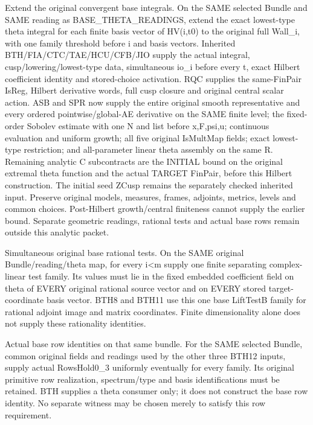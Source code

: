 \begin{description}[style=nextline]
\item[32. BASE\_THETA\_CUSPIDAL\_EXTENSION --- C] Extend the original convergent base integrals. On the SAME selected Bundle and SAME reading as BASE\_THETA\_READINGS, extend the exact lowest-type theta integral for each finite basis vector of HV(i,t0) to the original full Wall\_i, with one family threshold before i and basis vectors. Inherited BTH/FIA/CTC/TAE/HCU/CFB/JIO supply the actual integral, cusp/lowering/lowest-type data, simultaneous io\_i before every t, exact Hilbert coefficient identity and stored-choice activation. RQC supplies the same-FinPair IsReg, Hilbert derivative words, full cusp closure and original central scalar action. ASB and SPR now supply the entire original smooth representative and every ordered pointwise/global-AE derivative on the SAME finite level; the fixed-order Sobolev estimate with one N and list before x,F,psi,u; continuous evaluation and uniform growth; all five original IsMultMap fields; exact lowest-type restriction; and all-parameter linear theta assembly on the same R. Remaining analytic C subcontracts are the INITIAL bound on the original extremal theta function and the actual TARGET FinPair, before this Hilbert construction. The initial seed ZCusp remains the separately checked inherited input. Preserve original models, measures, frames, adjoints, metrics, levels and common choices. Post-Hilbert growth/central finiteness cannot supply the earlier bound. Separate geometric readings, rational tests and actual base rows remain outside this analytic packet.

\item[33. BASE\_THETA\_RATIONAL\_TESTS --- C] Simultaneous original base rational tests. On the SAME original Bundle/reading/theta map, for every i<m supply one finite separating complex-linear test family. Its values must lie in the fixed embedded coefficient field on theta of EVERY original rational source vector and on EVERY stored target-coordinate basis vector. BTH8 and BTH11 use this one base LiftTestB family for rational adjoint image and matrix coordinates. Finite dimensionality alone does not supply these rationality identities.

\item[34. SLR\_BASE\_ROWS\_PRODUCER --- C] Actual base row identities on that same bundle. For the SAME selected Bundle, common original fields and readings used by the other three BTH12 inputs, supply actual RowsHold0\_3 uniformly eventually for every family. Its original primitive row realization, spectrum/type and basis identifications must be retained. BTH supplies a theta consumer only; it does not construct the base row identity. No separate witness may be chosen merely to satisfy this row requirement.

\end{description}

